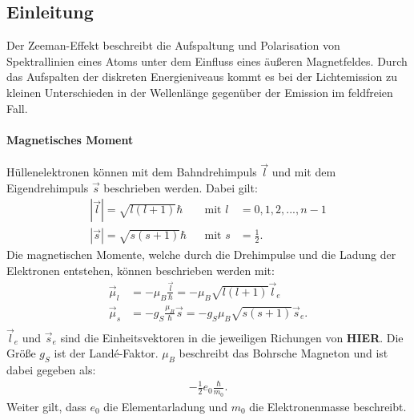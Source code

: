 \subsection{Einleitung}
Der Zeeman-Effekt beschreibt die Aufspaltung und Polarisation von Spektrallinien eines Atoms unter dem Einfluss eines äußeren Magnetfeldes.
Durch das Aufspalten der diskreten Energieniveaus kommt es bei der Lichtemission zu kleinen Unterschieden in der Wellenlänge gegenüber der Emission im feldfreien Fall.

\paragraph{Magnetisches Moment}
Hüllenelektronen können mit dem Bahndrehimpuls $\vec{l}$ und mit dem Eigendrehimpuls $\vec{s}$ beschrieben werden.
Dabei gilt:
\begin{align*}
  |\vec{l}|=\sqrt{l(l+1)}\hbar&& \text{mit } l &= 0,1,2,...,n-1\\
  |\vec{s}|=\sqrt{s(s+1)}\hbar&& \text{mit } s &= \frac{1}{2}.
\end{align*}
Die magnetischen Momente, welche durch die Drehimpulse und die Ladung der Elektronen entstehen, können beschrieben werden mit:
\begin{align*}
  \vec{\mu}_l &= -\mu_B \frac{\vec{l}}{\hbar} = -\mu_B \sqrt{l(l+1)}\vec{l}_e\\
  \vec{\mu}_s &= -g_S \frac{\mu_B}{\hbar}\vec{s} = -g_S \mu_B \sqrt{s(s+1)}\vec{s}_e.\\
\end{align*}
$\vec{l}_e$ und $\vec{s}_e$ sind die Einheitsvektoren in die jeweiligen Richungen von \textbf{\huge{HIER}}.
Die Größe $g_S$ ist der Landé-Faktor. $\mu_B$ beschreibt das Bohrsche Magneton und ist dabei gegeben als:
\begin{align*}
  -\frac{1}{2} e_0 \frac{\hbar}{m_0}.
\end{align*}
Weiter gilt, dass $e_0$ die Elementarladung und $m_0$ die Elektronenmasse beschreibt.

